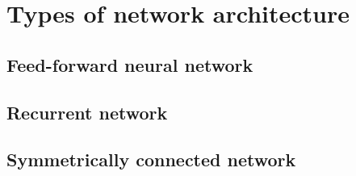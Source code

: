 \documentclass{article}
\begin{document}
\pagebreak


\section{Types of network architecture}

\subsection{Feed-forward neural network}

\begin{center}
    \begin{neuralnetwork}[height=4]
        \hiddenlayer[count=4, bias=false, title=Hidden\\units] \linklayers{}
        \outputlayer[count=2, title=Output\\units] \linklayers{}
    \end{neuralnetwork}
\end{center}

\subsection{Recurrent network}

\subsection{Symmetrically connected network}
\end{document}
